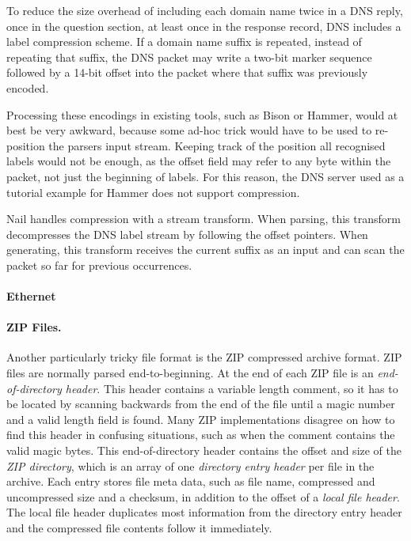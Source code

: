 To reduce the size overhead of including each domain name twice in a DNS reply, once in the
question section, at least once in the response record, DNS includes a label compression scheme. If
a domain name suffix is repeated, instead of repeating that suffix, the DNS packet may write a
two-bit marker sequence followed by a 14-bit offset into the packet where that suffix was previously
encoded.

Processing these encodings in existing tools, such as Bison or Hammer, would at best be very
awkward, because some ad-hoc trick would have to be used to re-position the parsers input stream.
Keeping track of the position all recognised labels would not be enough, as the offset field may
refer to any byte within the packet, not just the beginning of labels. For this reason, the DNS
server used as a tutorial example for Hammer does not support compression.

Nail handles compression with a stream transform. When parsing, this transform decompresses the DNS
label stream by following the offset pointers. When generating, this transform receives the current
suffix as an input and can scan the packet so far for previous occurrences. 


\paragraph{Ethernet}
\XXX[TODO]
\paragraph{ZIP Files.}
\label{s:eval-format-zip}
Another particularly tricky file format is the ZIP compressed archive format\cite{pkzip}.
ZIP files are normally parsed end-to-beginning. At the end of each ZIP file is an \emph{end-of-directory
header}. This header contains a variable length comment, so it has to be located by scanning
backwards from the end of the file until a magic number and a valid length field is found. Many ZIP
implementations disagree on how to find this header in confusing situations, such as when the
comment contains the valid magic bytes\cite{wolf-berlinsides-zip}.
This end-of-directory header contains the offset and size of the \emph{ZIP directory}, which is an
array of one \emph{directory entry header} per file in the archive.
Each entry stores file meta data, such as file name, compressed and uncompressed size and a checksum,
in addition to the offset of a \emph{local file header}. The local file header duplicates most
information from the directory entry header and the compressed file contents follow it immediately.

